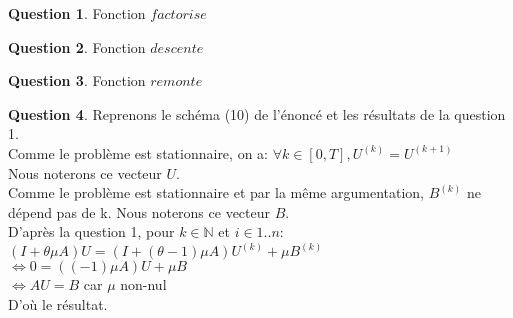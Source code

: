 \documentclass[a4paper]{article}
\theoremstyle{definition}
\newtheorem{que}{Question}
\begin{document}
	\begin{que}
		Fonction $factorise$
	\end{que}
	\begin{que}
		Fonction $descente$
	\end{que}
	\begin{que}
		Fonction $remonte$
	\end{que}
	\begin{que}
		Reprenons le schéma (10) de l'énoncé et les résultats de la question 1. \\

		Comme le problème est stationnaire, on a: $\forall k \in [0, T],  U^{(k)}=U^{(k+1)}$ \\
		Nous noterons ce vecteur $U$. \\

		Comme le problème est stationnaire et par la même argumentation, $B^{(k)}$ ne dépend pas de k. Nous noterons ce vecteur $B$. \\

		D'après la question 1, pour $k \in \mathbb{N}$ et $i \in 1..n$: \\
		$(I + \theta \mu A)U = (I + (\theta - 1) \mu A)U^{(k)} + \mu B^{(k)}$ \\
		$\Leftrightarrow 0 = (( - 1) \mu A)U + \mu B$ \\
		$\Leftrightarrow AU = B$ car $\mu$ non-nul \\
		D'où le résultat. \\
	\end{que}
\end{document}

